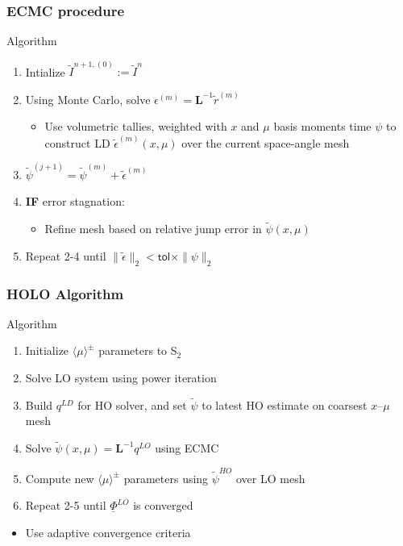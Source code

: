 \documentclass[xcolor=dvipsnames,hyperref={pdfpagelabels=false},handout,unknownkeysallowed]{beamer}
\newlength{\wideitemsep}
\let\olditem\item
\renewcommand{\item}{\setlength{\itemsep}{\wideitemsep}\olditem}
\newcommand{\B}[1]{\ensuremath{\mathbf{#1}}}
\newcommand{\mom}[1]{\langle #1 \rangle}
\begin{document}
\begin{frame}
    \frametitle{ECMC procedure}
    {
    \begin{block}{Algorithm}
    \begin{enumerate}
        \item Intialize $\tilde I^{n+1,(0)}:=\tilde I^{n}$
        \item Using Monte Carlo, solve $\epsilon^{(m)} = \B L^{-1} \tilde r^{(m)}$
            \begin{itemize}
                \item Use volumetric tallies, weighted with $x$ and $\mu$ basis moments time $\psi$ to construct LD
                    $\tilde\epsilon^{(m)}(x,\mu)$ over the current space-angle mesh
            \end{itemize}
        \item $\tilde \psi^{(j+1)} = \tilde \psi^{(m)} + \tilde \epsilon^{(m)}$
        \item \textbf{IF} error stagnation:
            \begin{itemize}
                \item Refine mesh based on relative jump error in $\tilde \psi(x,\mu)$
            \end{itemize}
        \item Repeat 2-4 until $\| \tilde \epsilon \|_2 < \textsf{tol}\times
            \|\psi\|_2$
    \end{enumerate}
    \end{block}
}
\end{frame}

\begin{frame}
    \frametitle{HOLO Algorithm}
    {
    \begin{block}{Algorithm}
        \begin{enumerate}
            \item Initialize $\mom{\mu}^{\pm}$ parameters to S$_2$
            \item Solve LO system using power iteration
            \item Build $q^{LD}$ for HO solver, and set $\tilde{\psi}$ to latest
                HO estimate
                on coarsest $x$--$\mu$ mesh
            \item Solve $\tilde \psi(x,\mu) = \B L^{-1}q^{LO}$ using ECMC
            \item Compute new $\mom{\mu}^\pm$ parameters using $\tilde \psi^{HO}$ over LO mesh
            \item Repeat 2-5 until $\underline \Phi^{LO}$ is converged
        \end{enumerate}

    \begin{itemize}
        \item Use adaptive convergence criteria
    \end{itemize}
    \end{block}
}
\end{frame}
\end{document}

